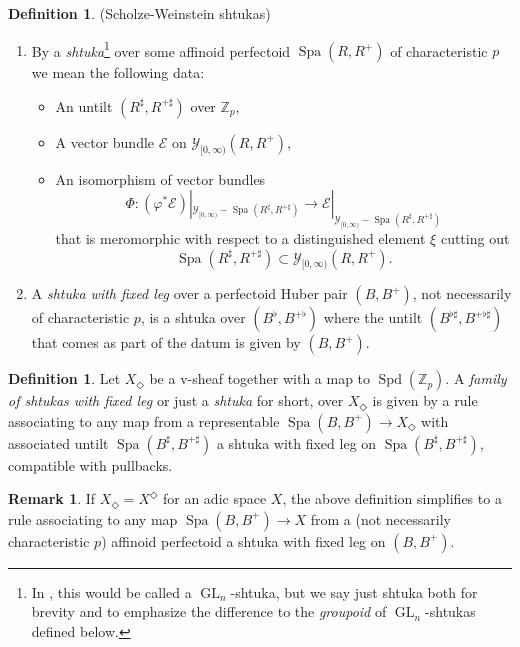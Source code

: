 \documentclass[10pt,twoside]{article}
\numberwithin{equation}{section}
\theoremstyle{plain}
\theoremstyle{definition}
\newtheorem{mydef}[mythm]{Definition}
\newtheorem{myrem}[mythm]{Remark}
\DeclareMathOperator{\Spa}{Spa}
\DeclareMathOperator{\Spd}{Spd}
\DeclareMathOperator{\GL}{GL}
\newcommand{\ZZ}{\mathbb{Z}}
\newcommand{\MCE}{\mathcal{E}}
\newcommand{\MCY}{\mathcal{Y}}
\let \phi \varphi
\let \diamond \Diamond
\newcommand{\Yco}{\MCY_{[0,\infty)}}
\begin{document}
\begin{mydef}(Scholze-Weinstein shtukas)\label{DefShtukas}
\begin{enumerate}
    \item By a \emph{shtuka}\footnote{In \cite{SW20}, this would be called a \(\GL_n\)-shtuka, but we say just shtuka both for brevity and to emphasize the difference to the \emph{groupoid} of \(\GL_n\)-shtukas defined below.} over some affinoid perfectoid \(\Spa(R,R^+)\) of characteristic \(p\) we mean the following data:
		\begin{itemize}
    		\item An untilt \((R^\sharp,R^{+\sharp})\) over \(\ZZ_p\),
    		\item A vector bundle \(\MCE\) on \(\Yco(R,R^+)\),
    		\item An isomorphism of vector bundles 
            \[\Phi\colon(\phi^*\MCE)|_{\Yco-\Spa(R^\sharp,R^{+\sharp})}
            \longrightarrow\MCE|_{\Yco-\Spa(R^\sharp,R^{+\sharp})}\]
            that is meromorphic with respect to a distinguished element \(\xi\) cutting out 
            \[\Spa(R^\sharp,R^{+\sharp})\subset \Yco(R,R^+).\]
		\end{itemize} 
    \item A \emph{shtuka with fixed leg} over a perfectoid Huber pair \((B,B^+)\), not necessarily of characteristic \(p\), is a shtuka over \((B^\flat,B^{+\flat})\) where the untilt \((B^{\flat\sharp},B^{+\flat\sharp})\) that comes as part of the datum is given by \((B,B^+)\).
\end{enumerate}
\end{mydef}

\begin{mydef}
    Let \(X_\diamond\) be a v-sheaf together with a map to \(\Spd(\ZZ_p)\). A \emph{family of shtukas with fixed leg} or just a \emph{shtuka} for short, over \(X_\diamond\) is given by a rule associating to any map from a representable \(\Spa(B,B^+)\to X_\diamond\) with associated untilt \(\Spa(B^\sharp,B^{+\sharp})\) a shtuka with fixed leg on \(\Spa(B^\sharp,B^{+\sharp})\), compatible with pullbacks.
\end{mydef}


\begin{myrem}\label{niceShtukaDescription}
If \(X_\diamond=X^\diamond\) for an adic space \(X\), the above definition simplifies to a rule associating to any map \(\Spa(B,B^+)\to X\) from a (not necessarily characteristic \(p\)) affinoid perfectoid a shtuka with fixed leg on \((B,B^+)\).
\end{myrem}
\end{document}
